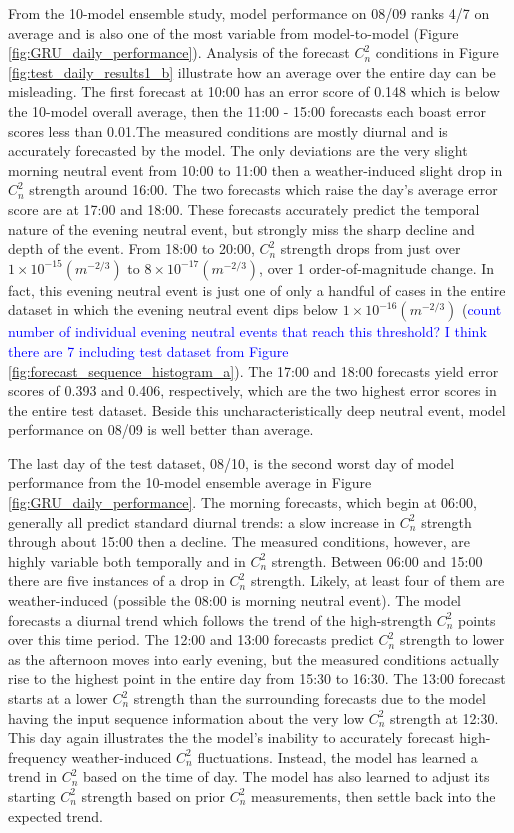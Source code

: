 From the 10-model ensemble study, model performance on 08/09 ranks 4/7 on average and is also one of the most variable from model-to-model (Figure \ref{fig:GRU_daily_performance}). Analysis of the forecast $C_{n}^{2}$ conditions in Figure \ref{fig:test_daily_results1_b} illustrate how an average over the entire day can be misleading. The first forecast at 10:00 has an error score of 0.148 which is below the 10-model overall average, then the 11:00 - 15:00 forecasts each boast error scores less than 0.01.The measured conditions are mostly diurnal and is accurately forecasted by the model. The only deviations are the very slight morning neutral event from 10:00 to 11:00 then a weather-induced slight drop in $C_{n}^{2}$ strength around 16:00. The two forecasts which raise the day's average error score are at 17:00 and 18:00. These forecasts accurately predict the temporal nature of the evening neutral event, but strongly miss the sharp decline and depth of the event. From 18:00 to 20:00, $C_{n}^{2}$ strength drops from just over $1 \times 10^{-15} (m^{-2/3})$ to $8 \times 10^{-17} (m^{-2/3})$, over 1 order-of-magnitude change. In fact, this evening neutral event is just one of only a handful of cases in the entire dataset in which the evening neutral event dips below $1 \times 10^{-16} (m^{-2/3})$ (\textcolor{blue}{count number of individual evening neutral events that reach this threshold? I think there are 7 including test dataset from Figure \ref{fig:forecast_sequence_histogram_a}}). The 17:00 and 18:00 forecasts yield error scores of 0.393 and 0.406, respectively, which are the two highest error scores in the entire test dataset. Beside this uncharacteristically deep neutral event, model performance on 08/09 is well better than average.

The last day of the test dataset, 08/10, is the second worst day of model performance from the 10-model ensemble average in Figure \ref{fig:GRU_daily_performance}. The morning forecasts, which begin at 06:00, generally all predict standard diurnal trends: a slow increase in $C_{n}^{2}$ strength through about 15:00 then a decline. The measured conditions, however, are highly variable both temporally and in $C_{n}^{2}$ strength. Between 06:00 and 15:00 there are five instances of a drop in $C_{n}^{2}$ strength. Likely, at least four of them are weather-induced (possible the 08:00 is morning neutral event). The model forecasts a diurnal trend which follows the trend of the high-strength $C_{n}^{2}$ points over this time period. The 12:00 and 13:00 forecasts predict $C_{n}^{2}$ strength to lower as the afternoon moves into early evening, but the measured conditions actually rise to the highest point in the entire day from 15:30 to 16:30. The 13:00 forecast starts at a lower $C_{n}^{2}$ strength than the surrounding forecasts due to the model having the input sequence information about the very low $C_{n}^{2}$ strength at 12:30. This day again illustrates the the model's inability to accurately forecast high-frequency weather-induced $C_{n}^{2}$ fluctuations. Instead, the model has learned a trend in $C_{n}^{2}$ based on the time of day. The model has also learned to adjust its starting $C_{n}^{2}$ strength based on prior $C_{n}^{2}$ measurements, then settle back into the expected trend. 


